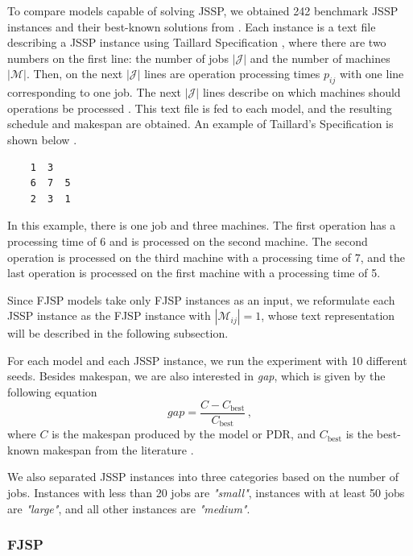 To compare models capable of solving JSSP, we obtained 242 benchmark JSSP instances and their best-known solutions from \cite{jssp_benchmarks}. Each instance is a text file describing a JSSP instance using Taillard Specification \cite{taillard_specification}, where there are two numbers on the first line: the number of jobs $|\mathcal{J}|$ and the number of machines $|\mathcal{M}|$. Then, on the next $|\mathcal{J}|$ lines are operation processing times $p_{ij}$ with one line corresponding to one job. The next $|\mathcal{J}|$ lines describe on which machines should operations be processed \cite{jssp_benchmarks}. This text file is fed to each model, and the resulting schedule and makespan are obtained.  An example of Taillard's Specification is shown below \cite{jssp_benchmarks}.
\begin{verbatim}
    1  3
    6  7  5
    2  3  1    
\end{verbatim}
In this example, there is one job and three machines. The first operation has a processing time of 6 and is processed on the second machine. The second operation is processed on the third machine with a processing time of 7, and the last operation is processed on the first machine with a processing time of 5.
\par
Since FJSP models take only FJSP instances as an input, we reformulate each JSSP instance as the FJSP instance with $|\mathcal{M}_{ij}| = 1$, whose text representation will be described in the following subsection. 
\par
For each model and each JSSP instance, we run the experiment with 10 different seeds. Besides makespan, we are also interested in \textit{gap}, which is given by the following equation
\begin{equation}
    gap  = \frac{C - C_\text{best}}{C_\text{best}} \, ,
\end{equation}
where $C$ is the makespan produced by the model or PDR, and $C_\text{best}$ is the best-known makespan from the literature \cite{jssp_benchmarks}.
\par
We also separated JSSP instances into three categories based on the number of jobs. Instances with less than 20 jobs are \textit{"small"}, instances with at least 50 jobs are \textit{"large"}, and all other instances are \textit{"medium"}.

\subsubsection{FJSP}

